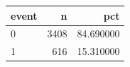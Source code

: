 \begin{tabular}{lrr}
\toprule
event & n & pct \\
\midrule
0 & 3408 & 84.690000 \\
1 & 616 & 15.310000 \\
\bottomrule
\end{tabular}

